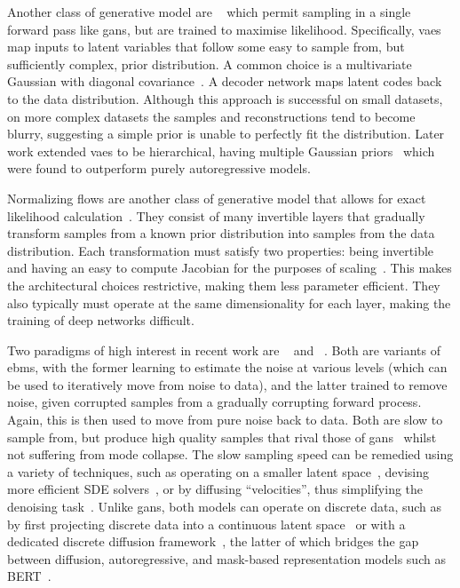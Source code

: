 Another class of generative model are ~\cite{kingma2013vae} which
permit sampling in a single forward pass like \glspl{gan}, but are trained to
maximise likelihood. Specifically, \glspl{vae} map inputs to latent variables
that follow some easy to sample from, but sufficiently complex, prior
distribution. A common choice is a multivariate Gaussian with diagonal
covariance~\cite{kingma2013vae}. A decoder network maps latent codes back
to the data distribution. Although this approach is successful on small
datasets, on more complex datasets the samples and reconstructions tend to
become blurry, suggesting a simple prior is unable to perfectly fit the
distribution. Later work extended \glspl{vae} to be hierarchical, having
multiple Gaussian priors~\cite{arash2020nvae,child2020vqvae} which were found to
outperform purely autoregressive models.

Normalizing flows are another class of generative model that allows for exact
likelihood calculation~\cite{dinh2014nice,dinh2016density,kingma2018glow}. They
consist of many invertible layers that gradually transform samples from a known
prior distribution into samples from the data distribution. Each transformation
must satisfy two properties: being invertible and having an easy to compute
Jacobian for the purposes of scaling~\cite{dinh2014nice,dinh2016density}. This
makes the architectural choices restrictive, making them less parameter
efficient. They also typically must operate at the same dimensionality for each
layer, making the training of deep networks difficult.

Two paradigms of high interest in recent work are
~\cite{ho2020ddpm,dhariwal2021ddpm} and
~\cite{song2019sbm,song2020sde,song2021mlt,vahdat2021sbmlatent}.
Both are variants of \glspl{ebm}, with the former learning to estimate the noise
at various levels (which can be used to iteratively move from noise to data),
and the latter trained to remove noise, given corrupted samples from a gradually
corrupting forward process. Again, this is then used to move from pure noise
back to data. Both are slow to sample from, but produce high quality samples
that rival those of \glspl{gan}~\cite{dhariwal2021ddpm} whilst not suffering
from mode collapse. The slow sampling speed can be remedied using a variety of
techniques, such as operating on a smaller latent
space~\cite{vahdat2021sbmlatent}, devising more efficient SDE
solvers~\cite{martineau2021fast}, or by diffusing ``velocities'', thus
simplifying the denoising task~\cite{dockhorn2021langevin}. Unlike \glspl{gan},
both models can operate on discrete data, such as by first projecting
discrete data into a continuous latent space~\cite{vahdat2021sbmlatent} or with
a dedicated discrete diffusion framework~\cite{austin2021structured}, the latter
of which bridges the gap between diffusion, autoregressive, and mask-based
representation models such as BERT~\cite{devlin2019bert}.

